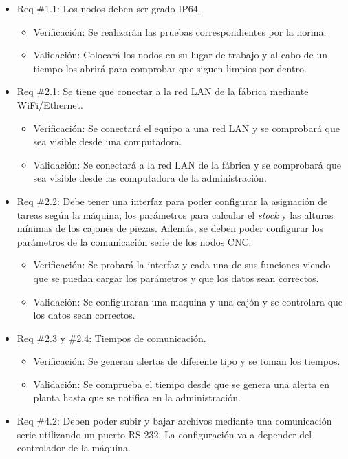 \documentclass[11pt]{charter}
\begin{document}
\begin{itemize}
    \item Req \#1.1: Los nodos deben ser grado IP64.
    \begin{itemize}
        \item Verificación: Se realizarán las pruebas correspondientes por la norma. 
        \item Validación: Colocará los nodos en su lugar de trabajo y al cabo de un tiempo los abrirá para comprobar que siguen limpios por dentro. 
    \end{itemize}
    \item Req \#2.1:  Se tiene que conectar a la red LAN de la fábrica mediante WiFi/Ethernet.
    \begin{itemize}
        \item Verificación: Se conectará el equipo a una red LAN y se comprobará que sea visible desde una computadora. 
        \item Validación: Se conectará a la red LAN de la fábrica y se comprobará que sea visible desde las computadora de la administración.
    \end{itemize}
    \item Req \#2.2: Debe tener una interfaz para poder configurar la asignación de tareas según la máquina, los parámetros para calcular el \textit{stock} y las alturas mínimas de los cajones de piezas. Además, se deben poder configurar los parámetros de la comunicación serie de los nodos CNC.
    \begin{itemize}
        \item Verificación: Se probará la interfaz y cada una de sus funciones viendo que se puedan cargar los parámetros y que los datos sean correctos.
        \item Validación: Se configuraran una maquina y una cajón y se controlara  que los datos sean correctos.
    \end{itemize}
    \item Req \#2.3 y \#2.4: Tiempos de comunicación.
    \begin{itemize}
        \item Verificación: Se generan alertas de diferente tipo y se toman los tiempos.
        \item Validación: Se comprueba el tiempo desde que se genera una alerta en planta hasta que se notifica en la administración. 
    \end{itemize}
    \item Req \#4.2: Deben poder subir y bajar archivos mediante una comunicación serie utilizando un puerto RS-232. La configuración va a depender del controlador de la máquina.

\end{itemize}
\end{document}
